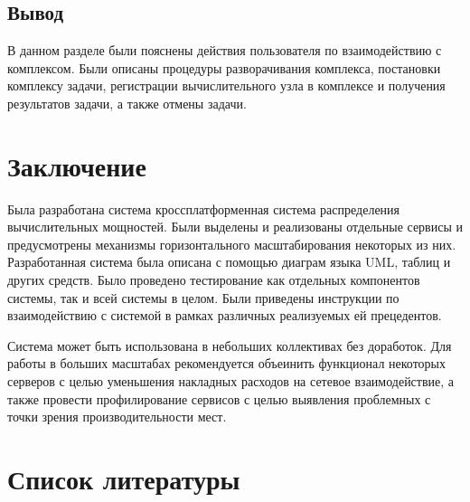 \documentclass[a4paper,12pt]{report}
\numberwithin{equation}{section}
\begin{document}
  \subsection{Вывод}
  В данном разделе были пояснены действия пользователя по взаимодействию с комплексом. 
  Были описаны процедуры разворачивания комплекса, постановки комплексу задачи, регистрации вычислительного узла в комплексе и получения результатов задачи, а также отмены задачи.
  
  \clearpage
  \section{Заключение}
  Была разработана система кроссплатформенная система распределения вычислительных мощностей. 
  Были выделены и реализованы отдельные сервисы и предусмотрены механизмы горизонтального масштабирования некоторых из них. 
  Разработанная система была описана с помощью диаграм языка UML, таблиц и других средств.
  Было проведено тестирование как отдельных компонентов системы, так и всей системы в целом.
  Были приведены инструкции по взаимодействию с системой в рамках различных реализуемых ей прецедентов.
  
  Система может быть использована в небольших коллективах без доработок.
  Для работы в больших масштабах рекомендуется объеинить функционал некоторых серверов с целью уменьшения накладных расходов на сетевое взаимодействие, а также провести профилирование сервисов с целью выявления проблемных с точки зрения производительности мест.
  
  \section{Список литературы}
  \printbibliography[heading=none]  
  
\end{document}
